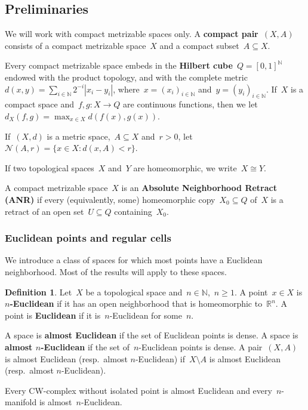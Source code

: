 \documentclass[english,11pt]{article}
\theoremstyle{plain}
\theoremstyle{remark}
\theoremstyle{definition}
\newtheorem{definition}{Definition}[section]
\newcommand{\Ne}{\mathcal{N}}
\newcommand{\R}{\mathbb{R}}
\newcommand{\N}{\mathbb{N}}
\begin{document}
\subsection{Preliminaries}

We will work with compact metrizable spaces only. A \textbf{compact pair}~$(X,A)$ consists of a compact metrizable space~$X$ and a compact subset~$A\subseteq X$.

Every compact metrizable space embeds in the \textbf{Hilbert cube}~$Q=[0,1]^\N$ endowed with the product topology, and with the complete metric~$d(x,y)=\sum_{i\in\N}2^{-i}|x_i-y_i|$, where~$x=(x_i)_{i\in\N}$ and~$y=(y_i)_{i\in\N}$. If~$X$ is a compact space and~$f,g:X\to Q$ are continuous functions, then we let~$d_X(f,g)=\max_{x\in X} d(f(x),g(x))$. 

If~$(X,d)$ is a metric space,~$A\subseteq X$ and~$r>0$, let~$\Ne(A,r)=\{x\in X:d(x,A)<r\}$.

If two topological spaces~$X$ and~$Y$ are homeomorphic, we write~$X\cong Y$.

A compact metrizable space~$X$ is an \textbf{Absolute Neighborhood Retract (ANR)} if every (equivalently, some) homeomorphic copy~$X_0\subseteq Q$ of~$X$ is a retract of an open set~$U\subseteq Q$ containing~$X_0$.


\subsubsection{\label{sec_euclidean}Euclidean points and regular cells}
We introduce a class of spaces for which most points have a Euclidean neighborhood. Most of the results will apply to these spaces.%
\begin{definition}
Let~$X$ be a topological space and~$n\in\N$,~$n\geq 1$. A point~$x\in X$ is \textbf{$n$-Euclidean} if it has an open neighborhood that is homeomorphic to~$\R^n$. A point is \textbf{Euclidean} if it is~$n$-Euclidean for some~$n$.

A space is \textbf{almost Euclidean} if the set of Euclidean points is dense. A space is \textbf{almost $n$-Euclidean} if the set of~$n$-Euclidean points is dense. A pair~$(X,A)$ is almost Euclidean (resp.~almost $n$-Euclidean) if~$X\setminus A$ is almost Euclidean (resp.~almost $n$-Euclidean).
\end{definition}

Every CW-complex without isolated point is almost Euclidean and every~$n$-manifold is almost~$n$-Euclidean.
\end{document}
